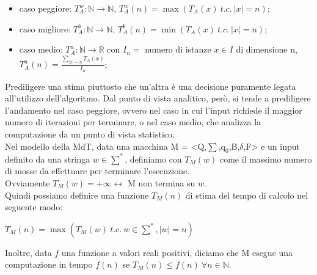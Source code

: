 \begin{itemize}
\item{caso peggiore: ${T}_{A}^w: \mathbb{N} \rightarrow \mathbb{N}$, ${T}_{A}^w(n) = \max({T}_{A}(x)\ t.c.\ |x| = n)$};
\item{caso migliore: ${T}_{A}^b: \mathbb{N} \rightarrow \mathbb{N}$, ${T}_{A}^b(n) = \min({T}_{A}(x)\ t.c.\ |x| = n)$};
\item{caso medio: ${T}_{A}^a: \mathbb{N} \rightarrow \mathbb{R}$ con $I_n = $ numero di istanze $x \in I$ di dimensione n, ${T}_{A}^a(n) = \frac{\sum \nolimits_{|x| = n} {T}_{A}(x)}{I_n}$};
\end{itemize}
Prediligere una stima piuttosto che un'altra è una decisione puramente legata all'utilizzo dell'algoritmo. Dal punto di vista analitico, però, si tende a prediligere l'andamento nel caso peggiore, ovvero nel caso in cui l'input richiede il maggior numero di iterazioni per terminare, o nel caso medio, che analizza la computazione da un punto di vista statistico.\\
Nel modello della MdT, data una macchina M = <Q,$\sum$,$\mathrm{q}_{0}$,B,$\delta$,F> e un input definito da una stringa $w \in \sum^*$, definiamo con $T_M(w)$ come il massimo numero di mosse da effettuare per terminare l'esecuzione.\\ Ovviamente $T_M(w) = +\infty \leftrightarrow$ M non termina su $ w $.\\
Quindi possiamo definire una funzione $T_M(n)$ di stima del tempo di calcolo nel seguente modo:
\begin{center}
{$T_M(n) = \max(T_M(w) \ t.c.\ w \in \sum^* , |w| = n)$}
\end{center}
Inoltre, data $ f $ una funzione a valori reali positivi, diciamo che M esegue una computazione in tempo $f(n)$ se $T_M(n) \leq f(n) \ \forall n \in \mathbb{N}$.
